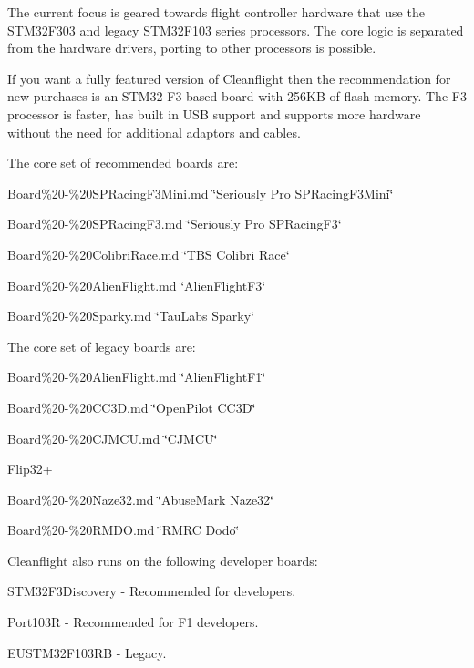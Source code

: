 The current focus is geared towards flight controller hardware that use the S\+T\+M32\+F303 and legacy S\+T\+M32\+F103 series processors. The core logic is separated from the hardware drivers, porting to other processors is possible.

If you want a fully featured version of Cleanflight then the recommendation for new purchases is an S\+T\+M32 F3 based board with 256\+K\+B of flash memory. The F3 processor is faster, has built in U\+S\+B support and supports more hardware without the need for additional adaptors and cables.

The core set of recommended boards are\+:


\begin{DoxyItemize}
\item Board\%20-\/\%20\+S\+P\+Racing\+F3\+Mini.\+md \char`\"{}\+Seriously Pro S\+P\+Racing\+F3\+Mini\char`\"{}
\item Board\%20-\/\%20\+S\+P\+Racing\+F3.\+md \char`\"{}\+Seriously Pro S\+P\+Racing\+F3\char`\"{}
\item Board\%20-\/\%20\+Colibri\+Race.\+md \char`\"{}\+T\+B\+S Colibri Race\char`\"{}
\item Board\%20-\/\%20\+Alien\+Flight.\+md \char`\"{}\+Alien\+Flight\+F3\char`\"{}
\item Board\%20-\/\%20\+Sparky.\+md \char`\"{}\+Tau\+Labs Sparky\char`\"{}
\end{DoxyItemize}

The core set of legacy boards are\+:


\begin{DoxyItemize}
\item Board\%20-\/\%20\+Alien\+Flight.\+md \char`\"{}\+Alien\+Flight\+F1\char`\"{}
\item Board\%20-\/\%20\+C\+C3\+D.\+md \char`\"{}\+Open\+Pilot C\+C3\+D\char`\"{}
\item Board\%20-\/\%20\+C\+J\+M\+C\+U.\+md \char`\"{}\+C\+J\+M\+C\+U\char`\"{}
\item Flip32+
\item Board\%20-\/\%20\+Naze32.\+md \char`\"{}\+Abuse\+Mark Naze32\char`\"{}
\item Board\%20-\/\%20\+R\+M\+D\+O.\+md \char`\"{}\+R\+M\+R\+C Dodo\char`\"{}
\end{DoxyItemize}

Cleanflight also runs on the following developer boards\+:


\begin{DoxyItemize}
\item S\+T\+M32\+F3\+Discovery -\/ Recommended for developers.
\item Port103\+R -\/ Recommended for F1 developers.
\item E\+U\+S\+T\+M32\+F103\+R\+B -\/ Legacy.
\end{DoxyItemize}

